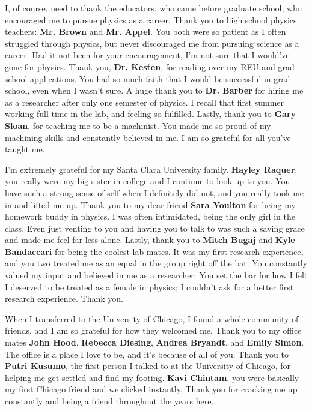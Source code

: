 \documentclass{ucetd}
\begin{document}
I, of course, need to thank the educators, who came before graduate school, who encouraged me to pursue physics as a career.  Thank you to high school physics teachers: \textbf{Mr. Brown} and \textbf{Mr. Appel}.  You both were so patient as I often struggled through physics, but never discouraged me from pursuing science as a career.  Had it not been for your encouragement, I'm not sure that I would've gone for physics.  Thank you, \textbf{Dr. Kesten}, for reading over my REU and grad school applications.  You had so much faith that I would be successful in grad school, even when I wasn't sure.  A huge thank you to \textbf{Dr. Barber} for hiring me as a researcher after only one semester of physics.  I recall that first summer working full time in the lab, and feeling so fulfilled.  Lastly, thank you to \textbf{Gary Sloan}, for teaching me to be a machinist.  You made me so proud of my machining skills and constantly believed in me.  I am so grateful for all you've taught me.

I'm extremely grateful for my Santa Clara University family.  \textbf{Hayley Raquer}, you really were my big sister in college and I continue to look up to you.  You have such a strong sense of self when I definitely did not, and you really took me in and lifted me up.  Thank you to my dear friend \textbf{Sara Youlton} for being my homework buddy in physics.  I was often intimidated, being the only girl in the class.  Even just venting to you and having you to talk to was such a saving grace and made me feel far less alone.  Lastly, thank you to \textbf{Mitch Bugaj} and \textbf{Kyle Bandaccari} for being the coolest lab-mates.  It was my first research experience, and you two treated me as an equal in the group right off the bat.  You constantly valued my input and believed in me as a researcher.  You set the bar for how I felt I deserved to be treated as a female in physics; I couldn't ask for a better first research experience.  Thank you.

When I transferred to the University of Chicago, I found a whole community of friends, and I am so grateful for how they welcomed me.  Thank you to my office mates \textbf{John Hood}, \textbf{Rebecca Diesing}, \textbf{Andrea Bryandt}, and \textbf{Emily Simon}.  The office is a place I love to be, and it's because of all of you.  Thank you to \textbf{Putri Kusumo}, the first person I talked to at the University of Chicago, for helping me get settled and find my footing.  \textbf{Kavi Chintam}, you were basically my first Chicago friend and we clicked instantly.  Thank you for cracking me up constantly and being a friend throughout the years here.
\end{document}
